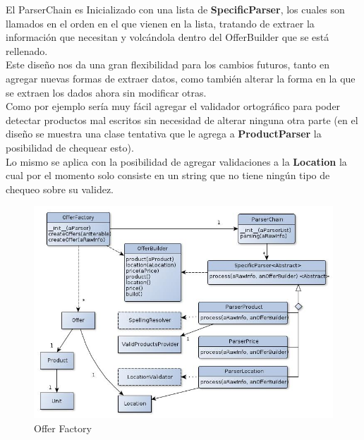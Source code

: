 \documentclass[10pt, a4paper]{article}
\begin{document}
El ParserChain es Inicializado con una lista de \textbf{SpecificParser}, los cuales son llamados en el orden en el que vienen en la lista, tratando de extraer la información que necesitan y volcándola dentro del OfferBuilder que se está rellenado.\\

Este diseño nos da una gran flexibilidad para los cambios futuros, tanto en agregar nuevas formas de extraer datos, como también alterar la forma en la que se extraen los dados ahora sin modificar otras.\\

Como por ejemplo sería muy fácil agregar el validador ortográfico para poder detectar productos mal escritos sin necesidad de alterar ninguna otra parte (en el diseño se muestra una clase tentativa que le agrega a \textbf{ProductParser} la posibilidad de chequear esto).\\

Lo mismo se aplica con la posibilidad de agregar validaciones a la \textbf{Location} la cual por el momento solo consiste en un string que no tiene ningún tipo de chequeo sobre su validez.\\ 



\begin{figure}[H]
\centering
\includegraphics[scale=0.65]{graphics/parser_class.jpg}
\caption{Offer Factory}
\end{figure}
\end{document}
